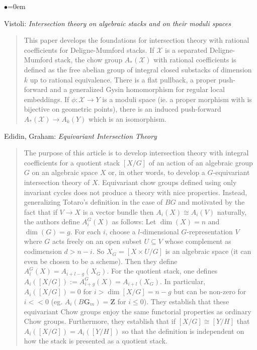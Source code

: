 \begin{list}{$\bullet$}{\leftmargin=0em}
\item
Vistoli: \emph{Intersection theory on algebraic stacks and on their moduli
spaces} \cite{vistoli_intersection}
\begin{quote}
This paper develops the foundations for intersection theory with rational
coefficients for Deligne-Mumford stacks. If $\mathcal{X}$ is a separated
Deligne-Mumford stack, the chow group $A_*(\mathcal{X})$ with rational
coefficients is
defined as the free abelian group of integral closed substacks of dimension $k$
up to rational equivalence. There is a flat pullback, a proper push-forward
and a generalized Gysin homomorphism for regular local embeddings. If $\phi:
\mathcal{X} \to Y$ is a moduli space (ie. a proper morphism with is bijective
on
geometric points), there is an induced push-forward $A_*(\mathcal{X}) \to
A_k(Y)$
which is an isomorphism.
\end{quote}
\smallskip
\item Edidin, Graham: \emph{Equivariant Intersection Theory}
\cite{edidin-graham}
\begin{quote}
The purpose of this article is to develop intersection theory with integral
coefficients for a quotient stack $[X/G]$ of an action of an algebraic group
$G$ on an algebraic space $X$ or, in other words, to develop a $G$-equivariant
intersection theory of $X$. Equivariant chow groups defined using only
invariant cycles does not produce a theory with nice properties. Instead,
generalizing Totaro's definition in the case of $BG$ and motivated by the fact
that if $V \to X$ is a vector bundle then $A_i(X) \cong A_i(V)$ naturally, the
authors define $A_i^G(X)$ as follows:
Let $\dim(X) = n$ and $\dim(G) = g$. For each $i$, choose a $l$-dimensional
$G$-representation $V$ where $G$ acts freely on an open subset $U \subseteq V$
whose complement as codimension $d > n-i$. So $X_G= [X \times U / G]$ is an
algebraic space (it can even be chosen to be a scheme). Then they define
$A_i^G(X) = A_{i+l-g}(X_G)$. For the quotient stack, one defines $A_i( [X/G])
:= A_{i+g}^G(X) = A_{i+l}(X_G)$. In particular, $A_i([X/G]) = 0$ for $i > \dim
[X/G] = n - g$ but can be non-zero for $i << 0$ (eg. $A_i(B \mathbf{G}_m) =
\mathbf{Z}$ for
$i \le 0$).
They establish that these equivariant Chow groups enjoy the same functorial
properties as ordinary Chow groups. Furthermore, they establish that if $[X /
G] \cong [Y / H]$ that $A_i([X/G]) = A_i([Y/H])$ so that the definition is
independent on how the stack is presented as a quotient stack.

\end{quote}
\end{list}
